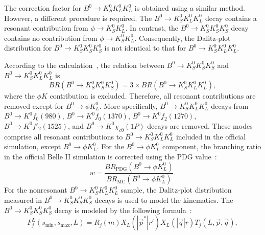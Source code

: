 The correction factor for $B^{0}\rightarrow K_{S}^{0}K_{L}^{0}K_{L}^{0}$ is obtained using a similar method.
However, a different procedure is required.
The $B^{0} \rightarrow K_{S}^{0} K_{L}^{0} K_{L}^{0}$ decay contains a resonant contribution from $\phi\rightarrow K_{S}^{0}K_{L}^{0}$.
In contrast, the $B^{0}\rightarrow K_{S}^{0}K_{S}^{0}K_{S}^{0}$ decay contains no contribution from $\phi\rightarrow K_{S}^{0}K_{L}^{0}$.
Consequently, the Dalitz-plot distribution for $B^{0}\rightarrow K_{S}^{0}K_{S}^{0}K_{S}^{0}$ is not identical to that for $B^{0}\rightarrow K_{S}^{0}K_{L}^{0}K_{L}^{0}$.

According to the calculation~\cite{Gronau:2005ax}, the relation between $B^{0}\rightarrow K_{S}^{0} K_{S}^{0} K_{S}^{0}$ and $B^{0} \rightarrow K_{S}^{0} K_{L}^{0} K_{L}^{0}$ is
\begin{equation}
    BR(B^{0}\rightarrow K_{S}^{0} K_{S}^{0} K_{S}^{0}) = 3 \times BR(B^{0}\rightarrow K_{S}^{0} K_{L}^{0} K_{L}^{0}),
\end{equation}
where the $\phi K$ contribution is excluded.
Therefore, all resonant contributions are removed except for $B^{0}\rightarrow\phi K_{L}^{0}$.
More specifically, $B^{0}\rightarrow K_{S}^{0} K_{L}^{0} K_{L}^{0}$ decays from $B^{0}\rightarrow K^{0} f_{0}(980)$, $B^{0}\rightarrow K^{0} f_{0}(1370)$, $B^{0}\rightarrow K^{0} f_{2}(1270)$, $B^{0}\rightarrow K^{0} f'_{2}(1525)$, and $B^{0}\rightarrow K^{0} \chi_{c0}(1P)$ decays are removed.
These modes comprise all resonant contributions to $B^{0}\rightarrow K_{S}^{0}K_{L}^{0}K_{L}^{0}$ included in the official simulation, except $B^{0} \rightarrow \phi K_{L}^{0}$.
For the $B^{0}\rightarrow\phi K_{L}^{0}$ component, the branching ratio in the official Belle II simulation is corrected using the PDG value~\cite{ParticleDataGroup:2024cfk}:
\begin{equation}
    w =
    \frac{
    BR_{\textrm{PDG}}(B^{0}\rightarrow \phi K_{L}^{0})
    }{
    BR_{\textrm{MC}}
    (B^{0}\rightarrow \phi K_{L}^{0})
    }.
\end{equation}
For the nonresonant $B^{0}\rightarrow K_{S}^{0}K_{L}^{0}K_{L}^{0}$ sample, the Dalitz-plot distribution measured in $B^{0}\rightarrow K_{S}^{0}K_{S}^{0}K_{S}^{0}$ decays is used to model the kinematics.
The $B^{0}\rightarrow K_{S}^{0} K_{S}^{0} K_{S}^{0}$ decay is modeled by the following formula~\cite{BaBar:2011ktx}:
\begin{equation}
    F^{L}_{j}\left(s_{\textrm{min}}, s_{\textrm{max}},L \right) = R_{j}\left(m \right) X_{L}\left( \left|\overrightarrow{p}^{*} \right| r' \right) X_{L}\left( \left|\overrightarrow{q} \right| r \right) T_{j} \left(L,\overrightarrow{p},\overrightarrow{q} \right),
\end{equation}
